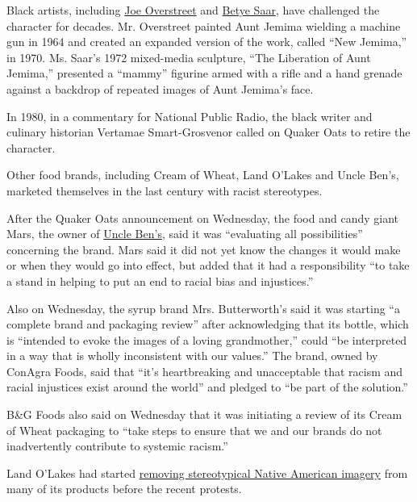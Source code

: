 Black artists, including
\href{https://www.tate.org.uk/whats-on/tate-modern/exhibition/ey-exhibition-world-goes-pop/artist-interview/joe-overstreet}{Joe
Overstreet} and
\href{https://www.nytimes3xbfgragh.onion/video/opinion/100000006923399/betye-saar-taking-care-of-business.html}{Betye
Saar}, have challenged the character for decades. Mr. Overstreet painted
Aunt Jemima wielding a machine gun in 1964 and created an expanded
version of the work, called ``New Jemima,'' in 1970. Ms. Saar's 1972
mixed-media sculpture, ``The Liberation of Aunt Jemima,'' presented a
``mammy'' figurine armed with a rifle and a hand grenade against a
backdrop of repeated images of Aunt Jemima's face.

In 1980, in a commentary for National Public Radio, the black writer and
culinary historian Vertamae Smart-Grosvenor called on Quaker Oats to
retire the character.

Other food brands, including Cream of Wheat, Land O'Lakes and Uncle
Ben's, marketed themselves in the last century with racist stereotypes.

After the Quaker Oats announcement on Wednesday, the food and candy
giant Mars, the owner of
\href{https://www.nytimes3xbfgragh.onion/2007/03/30/business/media/30adco.html}{Uncle
Ben's}, said it was ``evaluating all possibilities'' concerning the
brand. Mars said it did not yet know the changes it would make or when
they would go into effect, but added that it had a responsibility ``to
take a stand in helping to put an end to racial bias and injustices.''

Also on Wednesday, the syrup brand Mrs. Butterworth's said it was
starting ``a complete brand and packaging review'' after acknowledging
that its bottle, which is ``intended to evoke the images of a loving
grandmother,'' could ``be interpreted in a way that is wholly
inconsistent with our values.'' The brand, owned by ConAgra Foods, said
that ``it's heartbreaking and unacceptable that racism and racial
injustices exist around the world'' and pledged to ``be part of the
solution.''

B\&G Foods also said on Wednesday that it was initiating a review of its
Cream of Wheat packaging to ``take steps to ensure that we and our
brands do not inadvertently contribute to systemic racism.''

Land O'Lakes had started
\href{https://www.nytimes3xbfgragh.onion/2020/04/17/business/land-o-lakes-butter.html}{removing
stereotypical Native American imagery} from many of its products before
the recent protests.

